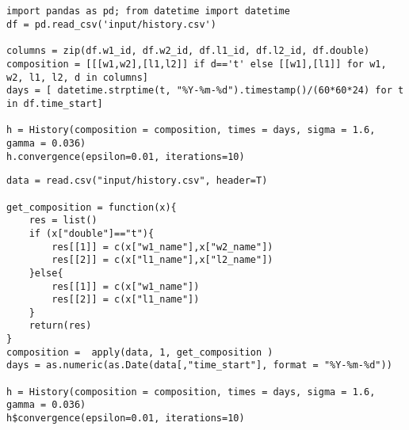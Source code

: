 \documentclass[article]{jss}
\newif\ifen
\newif\ifes
\newcommand{\en}[1]{\ifen#1\fi}
\newcommand{\es}[1]{\ifes#1\fi}
\begin{document}
\subsection{\en{The history of the Association of Tennis Professionals (ATP)}} \label{sec:appendix_atp_code}
%
\begin{lstlisting}[backgroundcolor=\color{python},caption={\en{\proglang{Python} code}\es{Código \proglang{Python}}},aboveskip=0.0 \baselineskip, belowskip=0.1cm]
import pandas as pd; from datetime import datetime
df = pd.read_csv('input/history.csv')

columns = zip(df.w1_id, df.w2_id, df.l1_id, df.l2_id, df.double)
composition = [[[w1,w2],[l1,l2]] if d=='t' else [[w1],[l1]] for w1, w2, l1, l2, d in columns]
days = [ datetime.strptime(t, "%Y-%m-%d").timestamp()/(60*60*24) for t in df.time_start]

h = History(composition = composition, times = days, sigma = 1.6, gamma = 0.036)
h.convergence(epsilon=0.01, iterations=10)
\end{lstlisting}
%
\begin{lstlisting}[backgroundcolor=\color{r},caption={\en{\proglang{R} code}\es{Código \proglang{R}}},aboveskip=0.0 \baselineskip, belowskip=0.1cm]
data = read.csv("input/history.csv", header=T)

get_composition = function(x){
    res = list()
    if (x["double"]=="t"){
        res[[1]] = c(x["w1_name"],x["w2_name"])
        res[[2]] = c(x["l1_name"],x["l2_name"])
    }else{
        res[[1]] = c(x["w1_name"])
        res[[2]] = c(x["l1_name"])
    }
    return(res)
}
composition =  apply(data, 1, get_composition ) 
days = as.numeric(as.Date(data[,"time_start"], format = "%Y-%m-%d"))

h = History(composition = composition, times = days, sigma = 1.6, gamma = 0.036)
h$convergence(epsilon=0.01, iterations=10)
\end{lstlisting}


\subsection{\en{Gaussian product}}\label{multiplicacion_normales}
\end{document}
